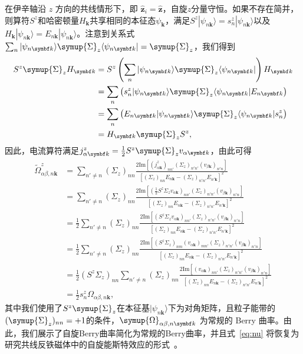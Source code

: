     在伊辛轴沿 $z$ 方向的共线情形下，即 $\hat{\symbf{z}}_i=\hat{\symbf{z}}$，自旋$z$分量守恒。如果不存在简并，则算符$S^z$和哈密顿量$H_{\bm{k}}$共享相同的本征态$\psi_{\bm{k}}$，满足$S^z |\psi_{n{\bm{k}}}\rangle=s_n^z|\psi_{n{\bm{k}}}\rangle$以及$H_{\bm{k}}|\psi_{n{\bm{k}}}\rangle=E_{n{\bm{k}}}|\psi_{n{\bm{k}}}\rangle$。注意到关系式$\sum_n|\psi_{n{\bm{k}}}\rangle\symup{\Sigma}_z\langle\psi_{n{\bm{k}}}|=\symup{\Sigma}_z$，我们得到
    \begin{align}
        S^z\symup{\Sigma}_z H_{\bm{k}}&=S^z\left(\sum_n|\psi_{n{\bm{k}}}\rangle\symup{\Sigma}_z\langle\psi_{n{\bm{k}}}|\right) H_{\bm{k}}\nonumber\\
        &=\sum_n \left(s_n^z|\psi_{n{\bm{k}}}\rangle\symup{\Sigma}_z\langle\psi_{n{\bm{k}}}| E_{n{\bm{k}}}\right)\nonumber\\
        &=\sum_n \left(E_{n{\bm{k}}}|\psi_{n{\bm{k}}}\rangle\symup{\Sigma}_z\langle\psi_{n{\bm{k}}}|s_n^z\right)\\
        &=H_{\bm{k}}\symup{\Sigma}_z S^z,
    \end{align}
    因此，电流算符满足$j_{\alpha {\bm{k}}}^{z}=\frac{1}{2} S^{z} \symup{\Sigma}_z v_{\alpha {\bm{k}}}$，由此可得
    \begin{align}
        \tilde{\Omega}_{\alpha \beta ,n{\bm{k}}}^{z} &=\sum _{n'\neq n} (\Sigma _{z} )_{nn}\frac{2\text{Im} [(j_{\alpha {\bm{k}}}^{z} )_{nn'} (\Sigma _{z} )_{n'n'} (v_{\beta {\bm{k}}} )_{n'n} ]}{[ (\Sigma _{z} )_{nn} E_{n{\bm{k}}} -(\Sigma _{z} )_{n'n'} E_{n'{\bm{k}}}]^{2}}\nonumber\\
         & =\sum _{n'\neq n} (\Sigma _{z} )_{nn}\frac{2\text{Im} [(\frac{1}{2} S^{z} \Sigma_z v_{\alpha {\bm{k}}} )_{nn'} (\Sigma _{z} )_{n'n'} (v_{\beta {\bm{k}}} )_{n'n} ]}{[ (\Sigma _{z} )_{nn} E_{n{\bm{k}}} -(\Sigma _{z} )_{n'n'} E_{n'{\bm{k}}}]^{2}}\nonumber\\
         & =\frac{1}{2}\sum _{n'\neq n} (\Sigma _{z} )_{nn}\frac{2\text{Im} [(S^{z} \Sigma_z v_{\alpha {\bm{k}}} )_{nn'} (\Sigma _{z} )_{n'n'} (v_{\beta {\bm{k}}} )_{n'n} ]}{[ (\Sigma _{z} )_{nn} E_{n{\bm{k}}} -(\Sigma _{z} )_{n'n'} E_{n'{\bm{k}}}]^{2}}\nonumber\\
         & =\frac{1}{2}\sum _{n'\neq n} (\Sigma _{z} )_{nn}\frac{2\text{Im} [(S^{z} \Sigma_z)_{nm}( v_{\alpha {\bm{k}}} )_{mn'} (\Sigma _{z} )_{n'n'} (v_{\beta {\bm{k}}} )_{n'n} ]}{[ (\Sigma _{z} )_{nn} E_{n{\bm{k}}} -(\Sigma _{z} )_{n'n'} E_{n'{\bm{k}}}]^{2}}\nonumber\\
         & =\frac{1}{2} (S^{z} \Sigma_z)_{nn}\sum _{n'\neq n} (\Sigma _{z} )_{nn}\frac{2\text{Im} [( v_{\alpha {\bm{k}}} )_{nn'} (\Sigma _{z} )_{n'n'} (v_{\beta {\bm{k}}} )_{n'n} ]}{[ (\Sigma _{z} )_{nn} E_{n{\bm{k}}} -(\Sigma _{z} )_{n'n'} E_{n'{\bm{k}}}]^{2}}\nonumber\\
         & =\frac{1}{2}s_n^{z} \Omega_{\alpha \beta ,n{\bm{k}}},
    \end{align}
    其中我们使用了$S^z\symup{\Sigma}_z$在本征基$|\psi_{n{\bm{k}}}\rangle$下为对角矩阵，且粒子能带的$(\symup{\Sigma}_z)_{nn}=+1$的条件，$\symup{\Omega}_{\alpha \beta ,n{\bm{k}}}$ 为常规的 Berry 曲率。由此，我们展示了自旋Berry曲率简化为常规的Berry曲率，并且式~\eqref{eq:nu} 将恢复为研究共线反铁磁体中的自旋能斯特效应的形式~\cite{cheng2016spin,zyuzin2016Magnon}。

